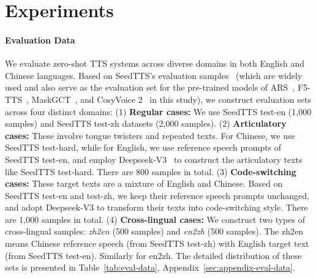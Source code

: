 \documentclass[11pt]{article}
\begin{document}


\section{Experiments}


\paragraph{Evaluation Data} 
We evaluate zero-shot TTS systems across diverse domains in both English and Chinese languages. Based on SeedTTS's evaluation samples~\cite{seedtts} (which are widely used and also serve as the evaluation set for the pre-trained models of ARS~\cite{maskgct}, F5-TTS~\cite{f5tts}, MaskGCT~\cite{maskgct}, and CosyVoice 2~\cite{cosyvoice2} in this study), we construct evaluation sets across four distinct domains: (1) \textbf{Regular cases:} We use SeedTTS test-en (1,000 samples) and SeedTTS test-zh datasets (2,000 samples). (2) \textbf{Articulatory cases:} These involve tongue twisters and repeated texts. For Chinese, we use SeedTTS test-hard, while for English, we use reference speech prompts of SeedTTS test-en, and employ Deepseek-V3~\cite{deepseek-v3} to construct the articulatory texts like SeedTTS test-hard. There are 800 samples in total. (3) \textbf{Code-switching cases:} These target texts are a mixture of English and Chinese. Based on SeedTTS test-en and test-zh, we keep their reference speech prompts unchanged, and adopt Deepseek-V3 to transform their texts into code-switching style. There are 1,000 samples in total. (4) \textbf{Cross-lingual cases:} We construct two types of cross-lingual samples: \textit{zh2en} (500 samples) and \textit{en2zh} (500 samples). The zh2en means Chinese reference speech (from SeedTTS test-zh) with English target text (from SeedTTS test-en). Similarly for en2zh. The detailed distribution of these sets is presented in Table~\ref{tab:eval-data}, Appendix~\ref{sec:appendix-eval-data}.
\end{document}
